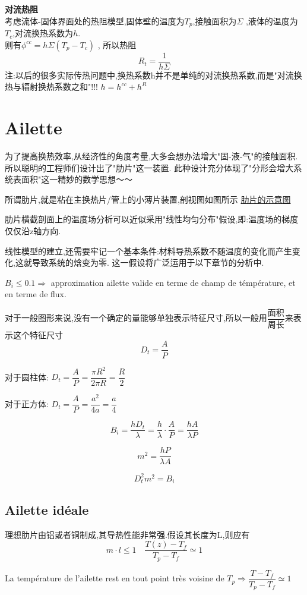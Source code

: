 \documentclass{article}
\begin{document}
\textbf{对流热阻}\\
考虑流体-固体界面处的热阻模型,固体壁的温度为$T_p$,接触面积为$\Sigma$ ,液体的温度为$T_c$,对流换热系数为$h$.\\
则有$\phi^{cc} = h\Sigma(T_p - T_c)$ , 所以热阻
$$R_t = \dfrac{1}{h\Sigma}$$
注:以后的很多实际传热问题中,换热系数h并不是单纯的对流换热系数,而是"对流换热与辐射换热系数之和"!!! $h=h^{cc} + h^R$

\section{Ailette}
为了提高换热效率,从经济性的角度考量,大多会想办法增大"固-液-气"的接触面积.
所以聪明的工程师们设计出了"肋片"这一装置.
此种设计充分体现了"分形会增大系统表面积"这一精妙的数学思想～～

所谓肋片,就是粘在主换热片/管上的小薄片装置,剖视图如图所示
\href{http://i.imgbox.com/UBJtc7TX.png}{肋片的示意图}

肋片横截剖面上的温度场分析可以近似采用"线性均匀分布"假设,即:温度场的梯度仅仅沿z轴方向.

线性模型的建立,还需要牢记一个基本条件:材料导热系数不随温度的变化而产生变化,这就导致系统的焓变为零.
这一假设将广泛运用于以下章节的分析中.

$B_i \leq 0.1 \Rightarrow$ approximation ailette valide en terme de champ de t\'emp\'erature, et en terme de flux.

对于一般图形来说,没有一个确定的量能够单独表示特征尺寸,所以一般用$\dfrac{\text{面积}}{\text{周长}}$来表示这个特征尺寸\\

$$D_t = \frac{A}{P}$$

对于圆柱体: $D_t = \dfrac{A}{P} = \dfrac{\pi R^2}{2 \pi R} = \dfrac{R}{2}$

对于正方体: $D_t = \dfrac{A}{P} = \dfrac{a^2}{4a} = \dfrac{a}{4}$

$$ B_i = \frac{h D_t}{\lambda} = \frac{h}{\lambda} \cdot \frac{A}{P} = \frac{hA}{\lambda P}$$

$$ m^2 = \frac{hP}{\lambda A}$$

$$ D_t^2 m^2 = B_i$$

\subsection{Ailette id\'eale}
理想肋片由铝或者铜制成,其导热性能非常强.假设其长度为L,则应有
$$ m\cdot l \leq 1 \quad \frac{T(z)-T_f}{T_p - T_f} \simeq 1 $$

La temp\'erature de l'ailette rest en tout point tr\`es voisine de $T_p  \Rightarrow \dfrac{ T - T_f}{T_p - T_f}\simeq 1$
\end{document}
